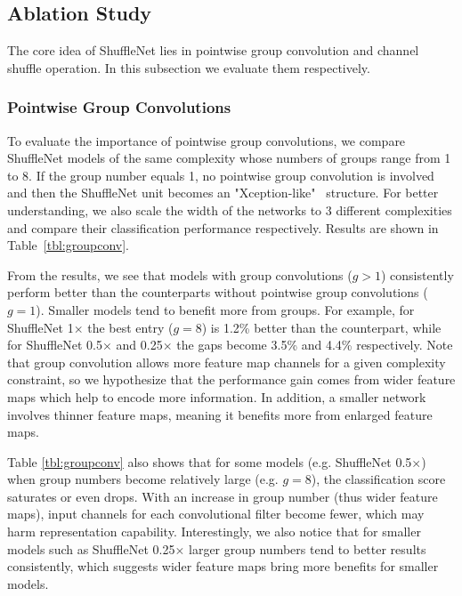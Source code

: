 \documentclass[10pt,twocolumn,letterpaper]{article}
\begin{document}
\subsection{Ablation Study}

The core idea of ShuffleNet lies in pointwise group convolution and channel shuffle operation. In this subsection we evaluate them respectively.

\subsubsection{Pointwise Group Convolutions}
\label{sec:gconv}

To evaluate the importance of pointwise group convolutions, we compare ShuffleNet models of the same complexity whose numbers of groups range from 1 to 8. If the group number equals 1, no pointwise group convolution is involved and then the ShuffleNet unit becomes an "Xception-like"~\cite{chollet2016xception} structure. For better understanding, we also scale the width of the networks to 3 different complexities and compare their classification performance respectively. Results are shown in Table~\ref{tbl:groupconv}.

From the results, we see that models with group convolutions ($g>1$) consistently perform better than the counterparts without pointwise group convolutions ($g=1$). Smaller models tend to benefit more from groups. For example, for ShuffleNet 1$\times$ the best entry ($g=8$) is 1.2\% better than the counterpart, while for ShuffleNet 0.5$\times$ and 0.25$\times$ the gaps become 3.5\% and 4.4\% respectively. Note that group convolution allows more feature map channels for a given complexity constraint, so we hypothesize that the performance gain comes from wider feature maps which help to encode more information. In addition, a smaller network involves thinner feature maps, meaning it benefits more from enlarged feature maps.

Table \ref{tbl:groupconv} also shows that for some models (e.g. ShuffleNet 0.5$\times$) when group numbers become relatively large (e.g. $g=8$), the classification score saturates or even drops. With an increase in group number (thus wider feature maps), input channels for each convolutional filter become fewer, which may harm representation capability. Interestingly, we also notice that for smaller models such as ShuffleNet 0.25$\times$ larger group numbers tend to better results consistently, which suggests wider feature maps bring more benefits for smaller models. 
\end{document}
